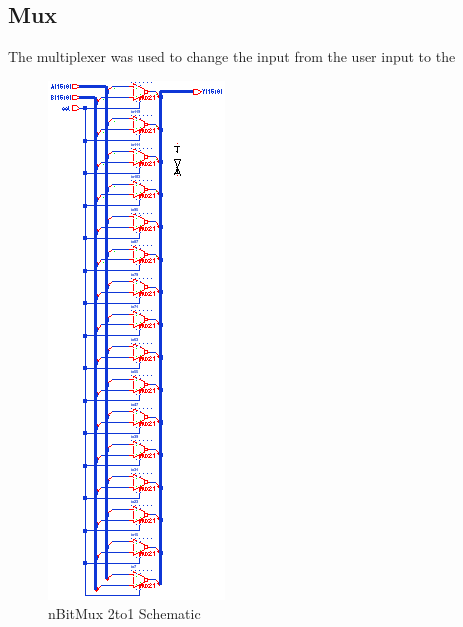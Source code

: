 \documentclass[11pt]{article}
\begin{document}
	
	\subsection{Mux}
		The multiplexer was used to change the input from the user input to the 
	
		\begin{figure}[H] 
			\centering 
			\includegraphics[width=\textwidth,height=\dimexpr\textheight-4\baselineskip-\abovecaptionskip-\belowcaptionskip\relax,keepaspectratio]{"Pictures/nBitMux_2to1 Schematic"}
			\caption{nBitMux 2to1 Schematic} 
			\label{fig:nBitMux-2to1-Schematic} 
		\end{figure}
	
\end{document}
